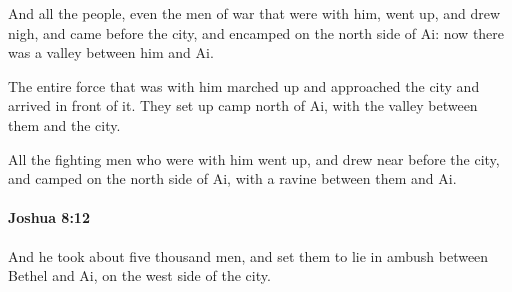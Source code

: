 			\begin{versebox}
					\item[BHS] 
					\item[ASV] And all the people, even the men of war that were with him, went up, and drew nigh, and came before the city, and encamped on the north side of Ai: now there was a valley between him and Ai.
					\item[NIV] The entire force that was with him marched up and approached the city and arrived in front of it. They set up camp north of Ai, with the valley between them and the city.
					\item[NRSV] All the fighting men who were with him went up, and drew near before the city, and camped on the north side of Ai, with a ravine between them and Ai.
			\end{versebox}

		\paragraph{Joshua 8:12} %
			\label{JOSHUA-8-12}

			And he took about five thousand men, and set them to lie in ambush between Bethel and Ai, on the west side of the city.

